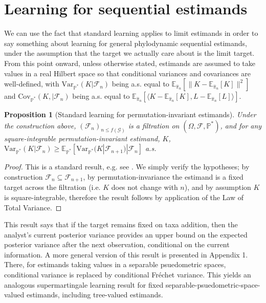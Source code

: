 \documentclass{article}
\newcommand{\Var}{\mathrm{Var}_{\mathbb{P}^*} }
\newcommand{\Cov}{\mathrm{Cov}_{\mathbb{P}^*} }
\newtheorem{prop}{Proposition}
\begin{document}
\section{Learning for sequential estimands}

We can use the fact that standard learning applies to limit estimands in order to say something about learning for general phylodynamic sequential estimands, under the assumption that the target we actually care about is the limit target. From this point onward, unless otherwise stated, estimands are assumed to take values in a real Hilbert space so that conditional variances and covariances are well-defined, with $\Var(K|\mathcal{F}_n)$ being a.s. equal to $\mathbb E_{\hat\pi_n}[\|K-\mathbb E_{\hat\pi_n}[K]\|^2]$ and $\Cov(K,|\mathcal{F}_n)$ being a.s. equal to $\mathbb E_{\hat\pi_n}[
\langle K-\mathbb E_{\hat\pi_n}[K],L-\mathbb E_{\hat\pi_n}[L]\rangle
]$.

\begin{prop}[Standard learning for permutation-invariant estimands]
\label{standardlearning}
Under the construction above, $(\mathcal{F}_n)_{n\leq f(\mathcal{G})}$ is a filtration on $(\Omega,\mathcal{F},\mathbb{P}^*)$, and for any square-integrable permutation-invariant estimand, $K$, $\Var(K|\mathcal{F}_n)\geq \mathbb{E}_{\mathbb{P}^*}[\Var(K|\mathcal{F}_{n+1})|\mathcal{F}_n]$ a.s.
\end{prop}
\begin{proof}
    This is a standard result, e.g. see \cite{durrett2010prob}. We simply verify the hypotheses; by construction $\mathcal{F}_n \subseteq \mathcal{F}_{n+1}$, by permutation-invariance the estimand is a fixed target across the filtration (i.e. $K$ does not change with $n$), and by assumption $K$ is square-integrable, therefore the result follows by application of the Law of Total Variance. 
\end{proof}

This result says that if the target remains fixed on taxa addition, then the analyst's current posterior variance provides an upper bound on the expected posterior variance after the next observation, conditional on the current information. A more general version of this result is presented in Appendix 1. There, for estimands taking values in a separable psuedometric spaces, conditional variance is replaced by conditional Fréchet variance. This yields an analogous supermartingale learning result for fixed separable-psuedometric-space-valued estimands, including tree-valued estimands.
 
\end{document}
